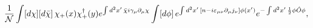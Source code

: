 \begin{equation}
\frac{1}{\cal N}\int [d\chi][d\bar{\chi}]\,\chi_+ (x)\chi^\dagger_+(y) e^{\int d^2x'\, \bar{\chi}i\gamma_{\mu}\partial_{\mu} \chi} \int [d\phi]\, e^{\int d^2x'\,[n-i\varepsilon_{\mu \nu}\partial_\mu j_\nu]\phi(x')} e^{-\int d^2x'\, \frac{1}{2}\phi\hat{O}\phi},
\label{++}
\end{equation}

